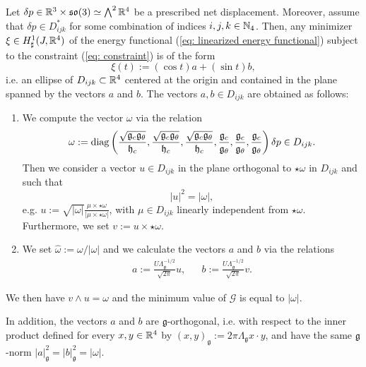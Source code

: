 \begin{theorem}
Let $\delta p \in \mathbb{R}^3 \times \mathfrak{so}(3) \simeq \bigwedge^2 \mathbb{R}^4$ be a prescribed net displacement. Moreover, assume that $\delta p \in D_{ijk}^*$ for some combination of indices $i,j,k \in \mathbb{N}_4$. Then, any minimizer $\xi \in H_{\sharp}^1(J, \mathbb{R}^4)$ of the energy functional (\ref{eq: linearized energy functional}) subject to the constraint (\ref{eq: constraint}) is of the form
\begin{equation}
\xi(t) := (\cos t) a + (\sin t) b,
\end{equation}
i.e. an ellipse of $D_{ijk} \subset \mathbb{R}^4$ centered at the origin and contained in the plane spanned by the vectors $a$ and $b$. The vectors $a,b \in D_{ijk}$ are obtained as follows:
\begin{enumerate}
\item We compute the vector $\omega$ via the relation
\begin{equation}
\omega := \operatorname{diag} \left (\frac{\sqrt{\mathfrak{g}_c \mathfrak{g}_{\theta}}}{\mathfrak{h}_c}, \frac{\sqrt{\mathfrak{g}_c \mathfrak{g}_{\theta}}}{\mathfrak{h}_c}, \frac{\sqrt{\mathfrak{g}_c \mathfrak{g}_{\theta}}}{\mathfrak{h}_c}, \frac{\mathfrak{g}_c}{\mathfrak{g}_\theta}, \frac{\mathfrak{g}_c}{\mathfrak{g}_\theta}, \frac{\mathfrak{g}_c}{\mathfrak{g}_\theta} \right ) \delta p \in D_{ijk}.
\end{equation}
Then we consider a vector $u \in D_{ijk}$ in the plane orthogonal to $\star \omega$ in $D_{ijk}$ and such that
\begin{equation}
|u|^2 = |\omega|,
\end{equation}
e.g. $u := \sqrt{|\omega|} \frac{\mu \times \star \omega}{|\mu \times \star \omega|}$, with $\mu \in D_{ijk}$ linearly independent from $\star \omega$. Furthermore, we set $v := u \times \star \omega$.

\item We set $\hat{\omega} := \omega/|\omega|$ and we calculate the vectors $a$ and $b$ via the relations
\begin{equation}
\begin{aligned}
a := \frac{U \Lambda_{\mathfrak{g}}^{-1/2}}{\sqrt{2 \pi}} u,&& b := \frac{U \Lambda_{\mathfrak{g}}^{-1/2}}{\sqrt{2 \pi}} v.
\end{aligned}
\end{equation}
\end{enumerate}
We then have $ v \wedge u = \omega$ and the minimum value of $\mathcal{G}$ is equal to $|\omega|$.

In addition, the vectors $a$ and $b$ are $\mathfrak{g}$-orthogonal, i.e. with respect to the inner product defined for every $x,y \in \mathbb{R}^4$ by $(x, y)_{\mathfrak{g}} := 2 \pi \Lambda_{\mathfrak{g}} x \cdot y$, and have the same $\mathfrak{g}$-norm $|a|_{\mathfrak{g}}^2 = |b|_{\mathfrak{g}}^2 = |\omega|$. 
\end{theorem}

